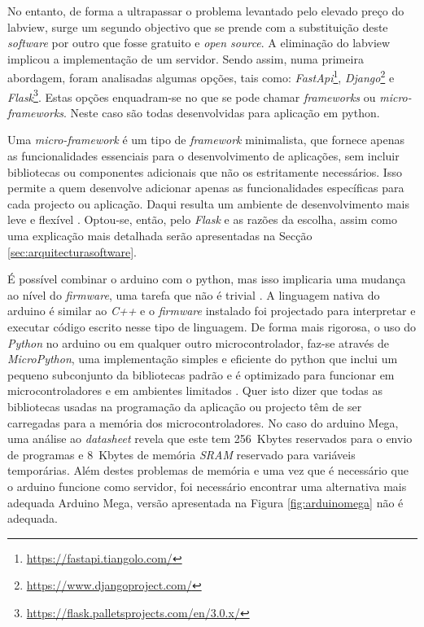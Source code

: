 No entanto, de forma a ultrapassar o problema levantado pelo elevado preço do \acrshort{labview}, surge um segundo objectivo que se prende com a substituição deste \textit{software} por outro que fosse gratuito e \textit{open source}. A eliminação do \acrshort{labview} implicou a implementação de um servidor. Sendo assim, numa primeira abordagem, foram analisadas algumas opções, tais como: \textit{FastApi}\footnote{\url{https://fastapi.tiangolo.com/}}, \textit{Django}\footnote{\url{https://www.djangoproject.com/}} e \textit{Flask}\footnote{\url{https://flask.palletsprojects.com/en/3.0.x/}}. Estas opções enquadram-se no que se pode chamar \textit{frameworks} ou \textit{micro-frameworks}. Neste caso são todas desenvolvidas para aplicação em \gls{python}.

Uma \textit{micro-framework} é um tipo de \textit{framework} minimalista, que fornece apenas as funcionalidades essenciais para o desenvolvimento de aplicações, sem incluir bibliotecas ou componentes adicionais que não os estritamente necessários. Isso permite a quem desenvolve adicionar apenas as funcionalidades específicas para cada projecto ou aplicação. Daqui resulta um ambiente de desenvolvimento mais leve e flexível \cite{Flask}.
Optou-se, então, pelo \textit{Flask} e as razões da escolha, assim como uma explicação mais detalhada serão apresentadas na Secção \ref{sec:arquitecturasoftware}.

É possível combinar o \gls{arduino} com o \gls{python}, mas isso implicaria uma mudança ao nível do \textit{firmware}, uma tarefa que não é trivial \cite{Arduinopython}. A linguagem nativa do \gls{arduino} é similar ao \textit{C++} e o \textit{firmware} instalado foi projectado para interpretar e executar código escrito nesse tipo de linguagem. De forma mais rigorosa, o uso do \textit{Python} no \gls{arduino} ou em qualquer outro microcontrolador, faz-se através de \textit{MicroPython}, uma implementação simples e eficiente do \gls{python} que inclui um pequeno subconjunto da bibliotecas padrão e é optimizado para funcionar em microcontroladores e em ambientes limitados \cite{MicroPythondefinition}. Quer isto dizer que todas as bibliotecas usadas na programação da aplicação ou projecto têm de ser carregadas para a memória dos microcontroladores. No caso do \gls{arduino} Mega, uma análise ao \textit{datasheet} \cite{megadatasheet} revela que este tem \SI{256}{Kbytes} reservados para o envio de programas e \SI{8}{Kbytes} de memória \textit{SRAM} reservado para variáveis temporárias.
Além destes problemas de memória e uma vez que é necessário que o \gls{arduino} funcione como servidor, foi necessário encontrar uma alternativa mais adequada Arduino Mega, versão apresentada na Figura \ref{fig:arduinomega} não é adequada.


